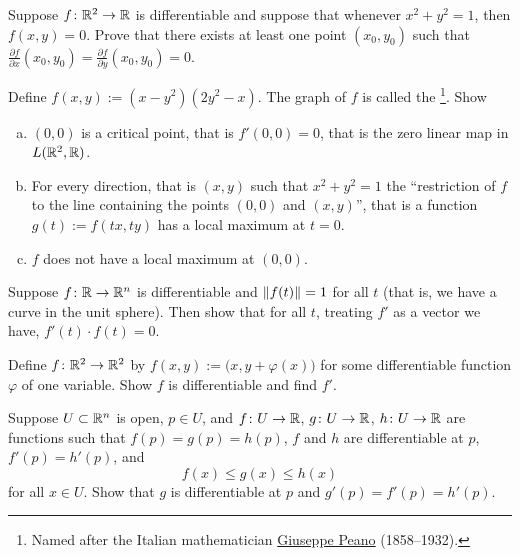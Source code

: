 \begin{exercise}
Suppose $f \colon {\mathbb{R}}^2 \to {\mathbb{R}}$ is differentiable and suppose that
whenever $x^2+y^2 = 1$, then $f(x,y) = 0$.  Prove that there exists at least
one point $(x_0,y_0)$ such that
$\frac{\partial f}{\partial x}(x_0,y_0) = \frac{\partial f}{\partial
y}(x_0,y_0) = 0$.
\end{exercise}

\begin{exercise} \label{exercise:peano}
Define $f(x,y) := ( x-y^2 ) ( 2 y^2 - x)$.  The graph of $f$ is called
the \emph{}%
\footnote{Named after the Italian mathematician
\href{http://en.wikipedia.org/wiki/Giuseppe_Peano}{Giuseppe Peano}
(1858--1932).}.
Show
\begin{enumerate}[a)]
\item
$(0,0)$ is a critical point, that is $f'(0,0) = 0$, that is the zero
linear map in $L({\mathbb{R}}^2,{\mathbb{R}})$.
\item
For every direction, that is $(x,y)$ such that $x^2+y^2=1$ the
``restriction of $f$ to the line containing the points $(0,0)$ and
$(x,y)$'', that is a function $g(t) := f(tx,ty)$ has a local maximum at
$t=0$.
\item
$f$ does not have a local maximum at $(0,0)$.
\end{enumerate}
\end{exercise}

\begin{exercise}
Suppose $f \colon {\mathbb{R}} \to {\mathbb{R}}^n$ is differentiable and $\lVert {f(t)} \rVert = 1$ for
all $t$ (that is, we have a curve in the unit sphere).  Then show that for
all $t$, treating $f'$ as a vector we have, $f'(t) \cdot f(t) = 0$.
\end{exercise}

\begin{exercise}
Define $f \colon {\mathbb{R}}^2 \to {\mathbb{R}}^2$ by $f(x,y) :=
\bigl(x,y+\varphi(x)\bigr)$ for some differentiable function $\varphi$ of one
variable.  Show $f$ is differentiable and find $f'$.
\end{exercise}

\begin{exercise}
Suppose $U \subset {\mathbb{R}}^n$ is open, $p \in U$, and
$f \colon U \to {\mathbb{R}}$,
$g \colon U \to {\mathbb{R}}$,
$h \colon U \to {\mathbb{R}}$ are functions such that
$f(p) = g(p) = h(p)$, $f$ and $h$ are differentiable at $p$,
$f'(p) = h'(p)$, and
\begin{equation*}
f(x) \leq g(x) \leq h(x)
\end{equation*}
for all $x \in U$.  Show that $g$ is differentiable at $p$ and 
$g'(p) = f'(p) = h'(p)$.
\end{exercise}

